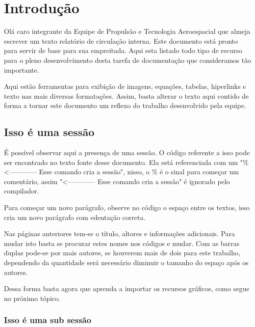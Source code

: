 \tableofcontents          %
\thispagestyle{empty}     %
\listoffigures            %
\thispagestyle{empty}     %
\mainmatter



\chapter{Introdução}%

Olá caro integrante da Equipe de Propulsão e Tecnologia Aeroespacial que almeja escrever um texto relatório de circulação interna. Este documento está pronto para servir de base para sua empreitada. Aqui esta listado todo tipo de recurso para o pleno desenvolvimento desta tarefa de documentação que consideramos tão importante.

Aqui estão ferramentas para exibição de imagens, equações, tabelas, hiperlinks e texto nas mais diversas formatações. Assim, basta alterar o texto aqui contido de forma a tornar este documento um reflexo do trabalho desenvolvido pela equipe.

\section{Isso é uma sessão} %
É possível observar aqui a presença de uma sessão. O código referente a isso pode ser encontrado no texto fonte desse documento. Ela está referenciada com um "\%  <------------  Esse comando cria a sessão", nisso, o \% é o sinal para começar um comentário, assim "<------------  Esse comando cria a sessão" é ignorado pelo compilador.

Para começar um novo parágrafo, observe no código o espaço entre os textos, isso cria um novo parágrafo com edentação correta.

Nas páginas anteriores tem-se o título, altores e informações adicionais. Para mudar isto basta se procurar estes nomes nos códigos e mudar. Com as barras duplas pode-se por mais autores, se houverem mais de dois para este trabalho, dependendo da quantidade será necessário diminuir o tamanho do espaço após os autores.

Dessa forma basta agora que aprenda a importar os recursos gráficos, como segue no próximo tópico.

\subsection{Isso é uma sub sessão} %

